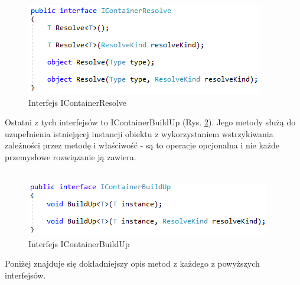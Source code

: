 \documentclass[12pt]{article}
\begin{document}
\begin{figure}[H]
	\begin{center}
  		\includegraphics{IContainerResolve.png}
  		\caption{Interfejs IContainerResolve}
  		\label{fig:IContainerResolve}
	\end{center}
\end{figure}
Ostatni z tych interfejsów to IContainerBuildUp (Rys. \ref{fig:IContainerBuildUp}). Jego metody służą do uzupełnienia istniejącej instancji obiektu z wykorzystaniem wstrzykiwania zależności przez metodę i właściwość - są to operacje opcjonalna i nie każde przemysłowe rozwiązanie ją zawiera.\\ \\
\begin{figure}[H]
	\begin{center}
  		\includegraphics{IContainerBuildUp.png}
  		\caption{Interfejs IContainerBuildUp}
  		\label{fig:IContainerBuildUp}
	\end{center}
\end{figure}
Poniżej znajduje się dokładniejszy opis metod z każdego z powyższych interfejsów.
\end{document}
